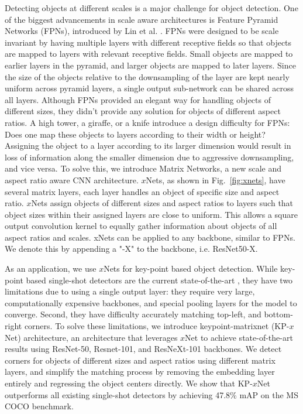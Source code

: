 \documentclass[10pt,twocolumn,letterpaper]{article}
\begin{document}
Detecting objects at different scales is a major challenge for object detection. One of the biggest advancements in scale aware architectures is Feature Pyramid Networks (FPNs), introduced by Lin et al. \cite{lin2017feature}. FPNs were designed to be scale invariant by having multiple layers with different receptive fields so that objects are mapped to layers with relevant receptive fields. Small objects are mapped to earlier layers in the pyramid, and larger objects are mapped to later layers. Since the size of the objects relative to the downsampling of the layer are kept nearly uniform across pyramid layers, a single output sub-network can be shared across all layers. Although FPNs provided an elegant way for handling objects of different sizes, they didn't provide any solution for objects of different aspect ratios. A high tower, a giraffe, or a knife introduce a design difficulty for FPNs: Does one map these objects to layers according to their width or height? Assigning the object to a layer according to its larger dimension would result in loss of information along the smaller dimension due to aggressive downsampling, and vice versa. To solve this, we introduce Matrix Networks, a new scale and aspect ratio aware CNN architecture. $x$Nets, as shown in Fig.~\ref{fig:xnets}, have several matrix layers, each layer handles an object of specific size and aspect ratio. $x$Nets assign objects of different sizes and aspect ratios to layers such that object sizes within their assigned layers are close to uniform. This allows a square output convolution kernel to equally gather information about objects of all aspect ratios and scales. xNets can be applied to any backbone, similar to FPNs. We denote this by appending a "-X" to the backbone, i.e. ResNet50-X.

As an application, we use $x$Nets for key-point based object detection. While key-point based single-shot detectors are the current state-of-the-art \cite{duan2019centernet}, they have two limitations due to using a single output layer: 
they require very large, computationally expensive backbones, and special pooling layers for the model to converge. Second, they have difficulty accurately matching top-left, and bottom-right corners. To solve these limitations, we introduce keypoint-matrixnet (KP-$x$Net) architecture, an architecture that leverages $x$Net to achieve state-of-the-art results using ResNet-50, Resnet-101, and ResNeXt-101 backbones. We detect corners for objects of different sizes and aspect ratios using different matrix layers, and simplify the matching process by removing the embedding layer entirely and regressing the object centers directly. We show that KP-$x$Net outperforms all existing single-shot detectors by achieving 47.8\% mAP on the MS COCO benchmark.
\end{document}
